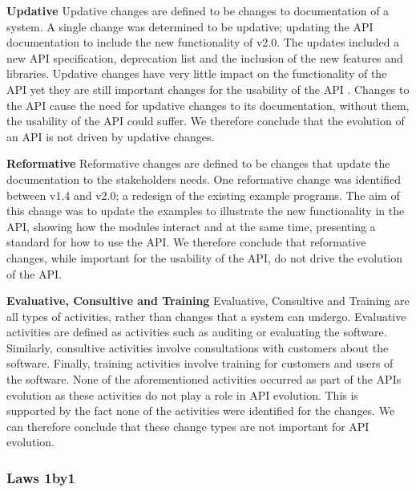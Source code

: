 \documentclass{sig-alternate}
\begin{document}
\smallskip \noindent
\textbf{Updative  }
Updative changes are defined to be changes to documentation of a system.
A single change was determined to be updative; updating the API documentation to include the new functionality of v2.0. The updates included a new API specification, deprecation list and the inclusion of the new features and libraries.
Updative changes have very little impact on the functionality of the API yet they are still important changes for the usability of the API \cite{shi2011empirical}. Changes to the API cause the need for updative changes to its documentation, without them, the usability of the API could suffer. We therefore conclude that the evolution of an API is not driven by updative changes.

\smallskip \noindent
\textbf{Reformative  }
Reformative changes are defined to be changes that update the documentation to the stakeholders needs.
One reformative change was identified between v1.4 and v2.0; a redesign of the existing example programs. The aim of this change was to update the examples to illustrate the new functionality in the API, showing how the modules interact and at the same time, presenting a standard for how to use the API.
We therefore conclude that reformative changes, while important for the usability of the API, do not drive the evolution of the API.

\smallskip \noindent
\textbf{Evaluative, Consultive and Training  }
Evaluative, Consultive and Training are all types of activities, rather than changes that a system can undergo. Evaluative activities are defined as activities such as auditing or evaluating the software. Similarly, consultive activities involve consultations with customers about the software. Finally, training activities involve training for customers and users of the software.
None of the aforementioned activities occurred as part of the APIs evolution as these activities do not play a role in API evolution. This is supported by the fact none of the activities were identified for the changes.
We can therefore conclude that these change types are not important for API evolution.


\subsubsection{Laws 1by1} 
\end{document}
